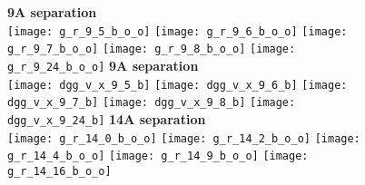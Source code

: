 \documentclass[journal=acsnano,manuscript=article]{achemso}
\begin{document}
\begin{figure}[h!]
	\centering
	\textbf{9A separation} \\
	\texttt{[image: g\_r\_9\_5\_b\_o\_o]} 
	\texttt{[image: g\_r\_9\_6\_b\_o\_o]}
	\texttt{[image: g\_r\_9\_7\_b\_o\_o]}
	\texttt{[image: g\_r\_9\_8\_b\_o\_o]}
	\texttt{[image: g\_r\_9\_24\_b\_o\_o]}
	\textbf{9A separation} \\
	\texttt{[image: dgg\_v\_x\_9\_5\_b]} 
	\texttt{[image: dgg\_v\_x\_9\_6\_b]}
	\texttt{[image: dgg\_v\_x\_9\_7\_b]}
	\texttt{[image: dgg\_v\_x\_9\_8\_b]}
	\texttt{[image: dgg\_v\_x\_9\_24\_b]}
	\textbf{14A separation} \\
	\texttt{[image: g\_r\_14\_0\_b\_o\_o]} 
	\texttt{[image: g\_r\_14\_2\_b\_o\_o]}
	\texttt{[image: g\_r\_14\_4\_b\_o\_o]}
	\texttt{[image: g\_r\_14\_9\_b\_o\_o]}
	\texttt{[image: g\_r\_14\_16\_b\_o\_o]}
	\label{fig:gr_9extra}
\end{figure}

\setlength{\fboxsep}{0.75pt}%
\setlength{\fboxrule}{1.2pt}%
\end{document}

